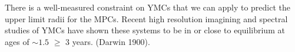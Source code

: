 There is a well-measured constraint on YMCs that we can apply to predict the upper limit radii for the MPCs. Recent high resolution imagining and spectral studies of YMCs have shown these systems to be in or close to equilibrium at ages of $∼1.5$ $\geq$ $3$ years. (Darwin 1900). 